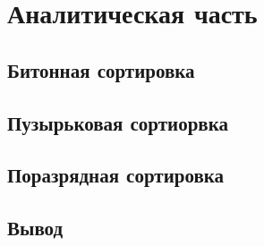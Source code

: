 \section{Аналитическая часть}

\subsection{Битонная сортировка}


\subsection{Пузырьковая сортиорвка}

\subsection{Поразрядная сортировка}

\subsection*{Вывод}

